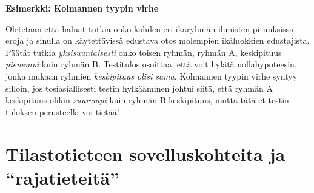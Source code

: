 \documentclass[
]{book}
\begin{document}
\begin{eblock}{}
\textbf{Esimerkki: Kolmannen tyypin virhe}

Oletetaan että haluat tutkia onko kahden eri ikäryhmän ihmisten pituuksissa eroja ja sinulla on käytettävissä edustava otos molempien ikäluokkien edustajista. Päätät tutkia \emph{yksisuuntaisesti} onko toisen ryhmän, ryhmän A, keskipituus \emph{pienempi} kuin ryhmän B. Testitulos osoittaa, että voit hylätä nollahypoteesin, jonka mukaan ryhmien \emph{keskipituus olisi sama}. Kolmannen tyypin virhe syntyy silloin, jos tosiasiallisesti testin hylkääminen johtui siitä, että ryhmän A keskipituus olikin \emph{suurempi} kuin ryhmän B keskipituus, mutta tätä et testin tuloksen perusteella voi tietää!

\end{eblock}

\hypertarget{alaluku36}{%
\section{Tilastotieteen sovelluskohteita ja ``rajatieteitä''}\label{alaluku36}}
\end{document}
